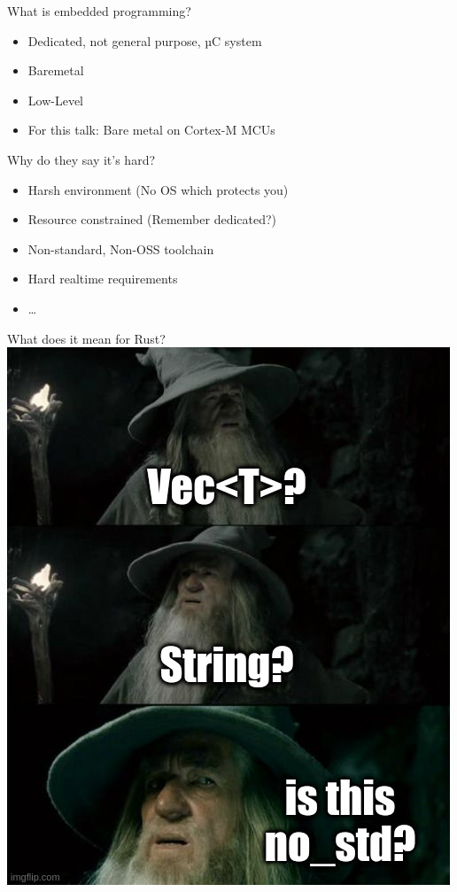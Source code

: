 \documentclass[aspectratio=1610,14pt,t]{beamer}
\begin{document}
\begin{frame}[c]{What is embedded programming?}
  \begin{itemize}
    \item Dedicated, not general purpose, µC system
    \item<1-> Baremetal
    \item<1-> Low-Level
    \item<2-> For this talk: Bare metal on Cortex-M MCUs
  \end{itemize}
\end{frame}

\begin{frame}[c]{Why do they say it's hard?}
  \begin{itemize}
    \item Harsh environment (No OS which protects you)
    \item Resource constrained (Remember dedicated?)
    \item Non-standard, Non-OSS toolchain
    \item Hard realtime requirements
    \item \ldots
  \end{itemize}
\end{frame}

\begin{frame}[c]{What does it mean for Rust?}
  \includegraphics[height=0.8\textheight]{img/no-std-gandalf.jpg}
\end{frame}
\end{document}
